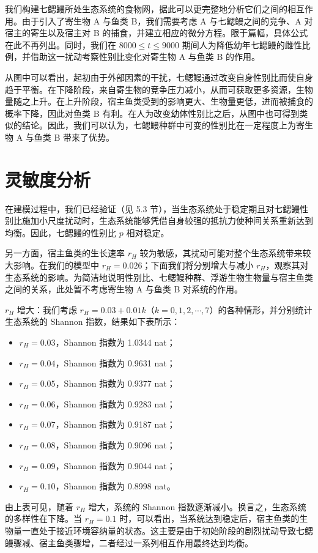 \documentclass[11pt,a4paper]{ctexart}
\begin{document}
我们构建七鳃鳗所处生态系统的食物网，据此可以更完整地分析它们之间的相互作用。由于引入了寄生物 A 与鱼类 B，我们需要考虑 A 与七鳃鳗之间的竞争、A 对宿主的寄生以及宿主对 B 的捕食，并建立相应的微分方程。限于篇幅，具体公式在此不再列出。同时，我们在 $8000\le t\le 9000$ 期间人为降低幼年七鳃鳗的雌性比例，并借助这一扰动考察性别比变化对寄生物 A 与鱼类 B 的作用。

从图中可以看出，起初由于外部因素的干扰，七鳃鳗通过改变自身性别比而使自身趋于平衡。在下降阶段，来自寄生物的竞争压力减小，从而可获取更多资源，生物量随之上升。在上升阶段，宿主鱼类受到的影响更大、生物量更低，进而被捕食的概率下降，因此对鱼类 B 有利。在人为改变幼体性别比之后，从图中也可得到类似的结论。因此，我们可以认为，七鳃鳗种群中可变的性别比在一定程度上为寄生物 A 与鱼类 B 带来了优势。

\section{灵敏度分析}

在建模过程中，我们已经验证（见 5.3 节），当生态系统处于稳定期且对七鳃鳗性别比施加小尺度扰动时，生态系统能够凭借自身较强的抵抗力使种间关系重新达到均衡。因此，七鳃鳗的性别比 $p$ 相对稳定。

另一方面，宿主鱼类的生长速率 $r_H$ 较为敏感，其扰动可能对整个生态系统带来较大影响。在我们的模型中 $r_H=0.026$；下面我们将分别增大与减小 $r_H$，观察其对生态系统的影响。为简洁地说明性别比、七鳃鳗种群、浮游生物生物量与宿主鱼类之间的关系，此处暂不考虑寄生物 A 与鱼类 B 对系统的作用。

$r_H$ 增大：我们考虑 $r_H=0.03+0.01k$（$k=0,1,2,\cdots,7$）的各种情形，并分别统计生态系统的 Shannon 指数，结果如下表所示：

\begin{itemize}
\item $r_H=0.03$，Shannon 指数为 1.0344 nat；
\item $r_H=0.04$，Shannon 指数为 0.9631 nat；
\item $r_H=0.05$，Shannon 指数为 0.9377 nat；
\item $r_H=0.06$，Shannon 指数为 0.9283 nat；
\item $r_H=0.07$，Shannon 指数为 0.9187 nat；
\item $r_H=0.08$，Shannon 指数为 0.9096 nat；
\item $r_H=0.09$，Shannon 指数为 0.9044 nat；
\item $r_H=0.10$，Shannon 指数为 0.8998 nat。
\end{itemize}

由上表可见，随着 $r_H$ 增大，系统的 Shannon 指数逐渐减小。换言之，生态系统的多样性在下降。当 $r_H=0.1$ 时，可以看出，当系统达到稳定后，宿主鱼类的生物量一直处于接近环境容纳量的状态。这主要是由于初始阶段的剧烈扰动导致七鳃鳗骤减、宿主鱼类骤增，二者经过一系列相互作用最终达到均衡。
\end{document}
